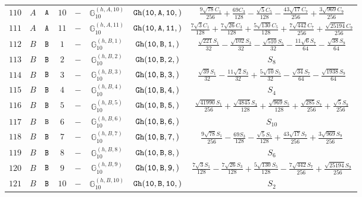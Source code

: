 \documentclass[fleqn,8pt]{jsarticle}
\begin{document}
\begin{table}[ht!]
\begin{center}
\begin{tabular}{cccccccc}
$ 110 $ & $ A $ & $ {\tt A} $ & $ 10 $ & $ - $ & $ \mathbb{G}_{10}^{(h,A,10)} $ & $ {\tt Gh(10,A,10,)} $ & $ \frac{9 \sqrt{78} C_{1}}{256} + \frac{69 C_{3}}{128} - \frac{\sqrt{5} C_{5}}{128} - \frac{43 \sqrt{17} C_{7}}{256} + \frac{3 \sqrt{969} C_{9}}{256} $ \\
$ 111 $ & $ A $ & $ {\tt A} $ & $ 11 $ & $ - $ & $ \mathbb{G}_{10}^{(h,A,11)} $ & $ {\tt Gh(10,A,11,)} $ & $ \frac{7 \sqrt{3} C_{1}}{128} + \frac{7 \sqrt{26} C_{3}}{128} + \frac{5 \sqrt{130} C_{5}}{128} + \frac{7 \sqrt{442} C_{7}}{256} + \frac{\sqrt{25194} C_{9}}{256} $ \\
$ 112 $ & $ B $ & $ {\tt B} $ & $ 1 $ & $ - $ & $ \mathbb{G}_{10}^{(h,B,1)} $ & $ {\tt Gh(10,B,1,)} $ & $ \frac{\sqrt{221} S_{1}}{32} - \frac{\sqrt{102} S_{3}}{32} - \frac{\sqrt{510} S_{5}}{32} - \frac{11 \sqrt{6} S_{7}}{64} - \frac{\sqrt{38} S_{9}}{64} $ \\
$ 113 $ & $ B $ & $ {\tt B} $ & $ 2 $ & $ - $ & $ \mathbb{G}_{10}^{(h,B,2)} $ & $ {\tt Gh(10,B,2,)} $ & $ S_{8} $ \\
$ 114 $ & $ B $ & $ {\tt B} $ & $ 3 $ & $ - $ & $ \mathbb{G}_{10}^{(h,B,3)} $ & $ {\tt Gh(10,B,3,)} $ & $ \frac{\sqrt{39} S_{1}}{32} - \frac{11 \sqrt{2} S_{3}}{32} + \frac{5 \sqrt{10} S_{5}}{32} - \frac{\sqrt{34} S_{7}}{64} - \frac{\sqrt{1938} S_{9}}{64} $ \\
$ 115 $ & $ B $ & $ {\tt B} $ & $ 4 $ & $ - $ & $ \mathbb{G}_{10}^{(h,B,4)} $ & $ {\tt Gh(10,B,4,)} $ & $ S_{4} $ \\
$ 116 $ & $ B $ & $ {\tt B} $ & $ 5 $ & $ - $ & $ \mathbb{G}_{10}^{(h,B,5)} $ & $ {\tt Gh(10,B,5,)} $ & $ \frac{\sqrt{41990} S_{1}}{256} + \frac{\sqrt{4845} S_{3}}{128} + \frac{\sqrt{969} S_{5}}{128} + \frac{\sqrt{285} S_{7}}{256} + \frac{\sqrt{5} S_{9}}{256} $ \\
$ 117 $ & $ B $ & $ {\tt B} $ & $ 6 $ & $ - $ & $ \mathbb{G}_{10}^{(h,B,6)} $ & $ {\tt Gh(10,B,6,)} $ & $ S_{10} $ \\
$ 118 $ & $ B $ & $ {\tt B} $ & $ 7 $ & $ - $ & $ \mathbb{G}_{10}^{(h,B,7)} $ & $ {\tt Gh(10,B,7,)} $ & $ \frac{9 \sqrt{78} S_{1}}{256} - \frac{69 S_{3}}{128} - \frac{\sqrt{5} S_{5}}{128} + \frac{43 \sqrt{17} S_{7}}{256} + \frac{3 \sqrt{969} S_{9}}{256} $ \\
$ 119 $ & $ B $ & $ {\tt B} $ & $ 8 $ & $ - $ & $ \mathbb{G}_{10}^{(h,B,8)} $ & $ {\tt Gh(10,B,8,)} $ & $ S_{6} $ \\
$ 120 $ & $ B $ & $ {\tt B} $ & $ 9 $ & $ - $ & $ \mathbb{G}_{10}^{(h,B,9)} $ & $ {\tt Gh(10,B,9,)} $ & $ \frac{7 \sqrt{3} S_{1}}{128} - \frac{7 \sqrt{26} S_{3}}{128} + \frac{5 \sqrt{130} S_{5}}{128} - \frac{7 \sqrt{442} S_{7}}{256} + \frac{\sqrt{25194} S_{9}}{256} $ \\
$ 121 $ & $ B $ & $ {\tt B} $ & $ 10 $ & $ - $ & $ \mathbb{G}_{10}^{(h,B,10)} $ & $ {\tt Gh(10,B,10,)} $ & $ S_{2} $ \\
 \hline \hline
\end{tabular}
\end{center}
\end{table}
\end{document}
